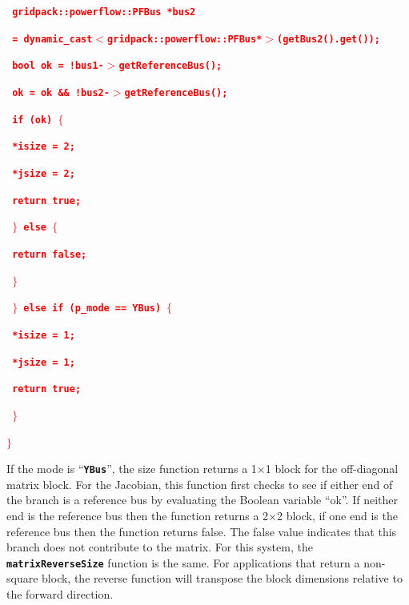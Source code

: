 \documentclass[12pt]{report} %
\begin{document}
\textcolor{red}{\texttt{\textbf{    gridpack::powerflow::PFBus *bus2}}}

\textcolor{red}{\texttt{\textbf{      = dynamic\_cast$\boldsymbol{\mathrm{<}}$gridpack::powerflow::PFBus*$\boldsymbol{\mathrm{>}}$(getBus2().get());}}}

\textcolor{red}{\texttt{\textbf{    bool ok = !bus1-$\boldsymbol{\mathrm{>}}$getReferenceBus();}}}

\textcolor{red}{\texttt{\textbf{    ok = ok \&\& !bus2-$\boldsymbol{\mathrm{>}}$getReferenceBus();}}}

\textcolor{red}{\texttt{\textbf{    if (ok) $\boldsymbol{\mathrm{\{}}$}}}

\textcolor{red}{\texttt{\textbf{      *isize = 2;}}}

\textcolor{red}{\texttt{\textbf{      *jsize = 2;}}}

\textcolor{red}{\texttt{\textbf{      return true;}}}

\textcolor{red}{\texttt{\textbf{    $\boldsymbol{\mathrm{\}}}$ else $\boldsymbol{\mathrm{\{}}$}}}

\textcolor{red}{\texttt{\textbf{      return false;}}}

\textcolor{red}{\texttt{\textbf{    $\boldsymbol{\mathrm{\}}}$}}}

\textcolor{red}{\texttt{\textbf{  $\boldsymbol{\mathrm{\}}}$ else if (p\_mode == YBus) $\boldsymbol{\mathrm{\{}}$}}}

\textcolor{red}{\texttt{\textbf{    *isize = 1;}}}

\textcolor{red}{\texttt{\textbf{    *jsize = 1;}}}

\textcolor{red}{\texttt{\textbf{    return true;}}}

\textcolor{red}{\texttt{\textbf{  $\boldsymbol{\mathrm{\}}}$}}}

\textcolor{red}{\texttt{\textbf{$\boldsymbol{\mathrm{\}}}$}}}

If the mode is ``\texttt{\textbf{YBus}}'', the size function returns a 1$\mathrm{\times}$1 block for the off-diagonal matrix block. For the Jacobian, this function first checks to see if either end of the branch is a reference bus by evaluating the Boolean variable ``ok''. If neither end is the reference bus then the function returns a 2$\mathrm{\times}$2 block, if one end is the reference bus then the function returns false. The false value indicates that this branch does not contribute to the matrix. For this system, the \texttt{\textbf{matrixReverseSize}} function is the same. For applications that return a non-square block, the reverse function will transpose the block dimensions relative to the forward direction.
\end{document}
